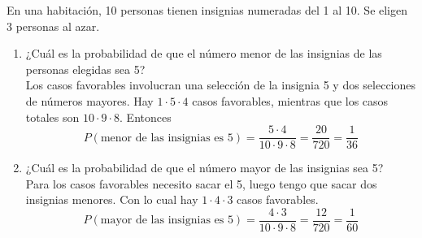 \item En una habitación, 10 personas tienen insignias numeradas del 1 al 10. Se eligen 3 personas al azar.
    \begin{enumerate}
        \item ¿Cuál es la probabilidad de que el número menor de las insignias de las personas elegidas sea 5?\e\\
            Los casos favorables involucran una selección de la insignia 5 y dos selecciones de números mayores. Hay $1\cdot5\cdot4$ casos favorables, mientras que los casos totales son $10\cdot9\cdot8$. Entonces\[P(\text{menor de las insignias es 5})=\frac{5\cdot4}{10\cdot9\cdot8}=\frac{20}{720}=\frac{1}{36}\]
        \item ¿Cuál es la probabilidad de que el número mayor de las insignias sea 5?\e\\
            Para los casos favorables necesito sacar el 5, luego tengo que sacar dos insignias menores. Con lo cual hay $1\cdot4\cdot3$ casos favorables.\[P(\text{mayor de las insignias es 5})=\frac{4\cdot3}{10\cdot9\cdot8}=\frac{12}{720}=\frac{1}{60}\]
    \end{enumerate}